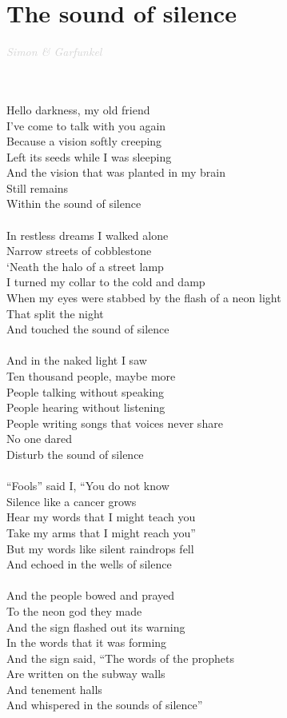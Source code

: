 \documentclass[a5paper, 10pt]{book}
\begin{document}
\section{The sound of silence}\textcolor{lightgray}{\textit{Simon \& Garfunkel}}\\~\\
\begin{minipage}[t]{0.7\textwidth}
  ~\\
Hello darkness, my old friend\\
I've come to talk with you again\\
Because a vision softly creeping\\
Left its seeds while I was sleeping\\
And the vision that was planted in my brain\\
Still remains\\
Within the sound of silence\\
\\
In restless dreams I walked alone\\
Narrow streets of cobblestone\\
`Neath the halo of a street lamp\\
I turned my collar to the cold and damp\\
When my eyes were stabbed by the flash of a neon light\\
That split the night\\
And touched the sound of silence\\
\\
And in the naked light I saw\\
Ten thousand people, maybe more\\
People talking without speaking\\
People hearing without listening\\
People writing songs that voices never share\\
No one dared\\
Disturb the sound of silence\\
\\
``Fools'' said I, ``You do not know\\
Silence like a cancer grows\\
Hear my words that I might teach you\\
Take my arms that I might reach you''\\
But my words like silent raindrops fell\\
And echoed in the wells of silence\\
\\
And the people bowed and prayed\\
To the neon god they made\\
And the sign flashed out its warning\\
In the words that it was forming\\
And the sign said, ``The words of the prophets\\
Are written on the subway walls\\
And tenement halls\\
And whispered in the sounds of silence''\\
\end{minipage}
\end{document}
